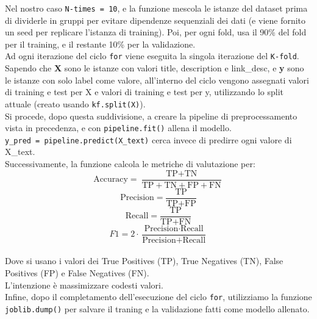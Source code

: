 \documentclass[a4paper,12pt]{report}
\begin{document}
Nel nostro caso \texttt{N-times = 10}, e la funzione mescola le istanze del dataset prima di dividerle in gruppi per evitare dipendenze sequenziali dei dati (e viene fornito un seed per replicare l'istanza di training). Poi, per ogni fold, usa il 90\% del fold per il training, e il restante 10\% per la validazione.\\
Ad ogni iterazione del ciclo \texttt{for} viene eseguita la singola iterazione del \texttt{K-fold}.\\
Sapendo che \textbf{X} sono le istanze con valori title, description e link\_desc, e \textbf{y} sono le istanze con solo label come valore, all'interno del ciclo vengono assegnati valori di training e test per X e valori di training e test per y, utilizzando lo split attuale (creato usando \texttt{kf.split(X)}).\\
Si procede, dopo questa suddivisione, a creare la pipeline di preprocessamento vista in precedenza, e con \texttt{pipeline.fit()} allena il modello.\\
\texttt{y\_pred = pipeline.predict(X\_text)} cerca invece di predirre ogni valore di X\_text.\\
Successivamente, la funzione calcola le metriche di valutazione per:
\[
\text{Accuracy} = \frac{\text{TP} + \text{TN}}{\text{TP} + \text{TN} + \text{FP} + \text{FN}}
\]
\[
\text{Precision} = \frac{\text{TP}}{\text{TP} + \text{FP}}
\]
\[
\text{Recall} = \frac{\text{TP}}{\text{TP} + \text{FN}}
\]
\[
F1 = 2 \cdot \frac{\text{Precision} \cdot \text{Recall}}{\text{Precision} + \text{Recall}}
\]
\\
Dove si usano i valori dei True Positives (TP), True Negatives (TN), False Positives (FP) e False Negatives (FN).\\
L'intenzione è massimizzare codesti valori.\\
Infine, dopo il completamento dell'esecuzione del ciclo \texttt{for}, utilizziamo la funzione \texttt{joblib.dump()} per salvare il traning e la validazione fatti come modello allenato.\\
\newpage
\end{document}
